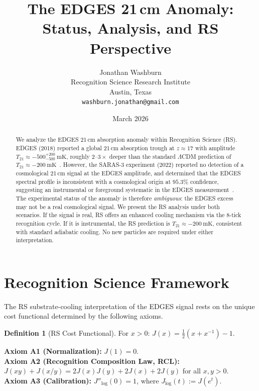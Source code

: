 \documentclass[12pt,a4paper]{article}
\title{The EDGES 21\,cm Anomaly:\\
Status, Analysis, and RS Perspective}
\author{Jonathan Washburn\\
Recognition Science Research Institute\\
Austin, Texas\\
\texttt{washburn.jonathan@gmail.com}}
\date{March 2026}
\theoremstyle{definition}
\newtheorem{definition}[theorem]{Definition}
\theoremstyle{remark}
\begin{document}
\maketitle

\begin{abstract}
We analyze the EDGES 21\,cm absorption anomaly within Recognition
Science (RS).  EDGES (2018) reported a global 21\,cm absorption
trough at $z \approx 17$ with amplitude $T_{21} \approx
-500^{+200}_{-500}~\mathrm{mK}$, roughly $2$--$3\times$ deeper than
the standard $\Lambda$CDM prediction of $T_{21} \approx
-200~\mathrm{mK}$~\cite{EDGES}.  However, the SARAS-3 experiment
(2022) reported no detection of a cosmological 21\,cm signal at the
EDGES amplitude, and determined that the EDGES spectral profile is
inconsistent with a cosmological origin at $95.3\%$ confidence,
suggesting an instrumental or foreground systematic in the EDGES
measurement~\cite{SARAS3}.  The experimental status of the anomaly
is therefore \emph{ambiguous}: the EDGES excess may not be a real
cosmological signal.  We present the RS analysis under both scenarios.
If the signal is real, RS offers an enhanced cooling mechanism via
the 8-tick recognition cycle.  If it is instrumental, the RS
prediction is $T_{21} \approx -200~\mathrm{mK}$, consistent with
standard adiabatic cooling.  No new particles are required under
either interpretation.
\end{abstract}

\section{Recognition Science Framework}
\label{sec:framework}

The RS substrate-cooling interpretation of the EDGES signal rests on
the unique cost functional determined by the following axioms.

\begin{definition}[RS Cost Functional]
For $x > 0$: $J(x) = \tfrac{1}{2}(x + x^{-1}) - 1$.
\end{definition}

\noindent\textbf{Axiom A1 (Normalization):} $J(1) = 0$.\\
\textbf{Axiom A2 (Recognition Composition Law, RCL):}
$J(xy)+J(x/y)=2J(x)J(y)+2J(x)+2J(y)$ for all $x,y>0$.\\
\textbf{Axiom A3 (Calibration):} $J''_{\log}(0) = 1$, where
$J_{\log}(t) := J(e^t)$.
\end{document}
